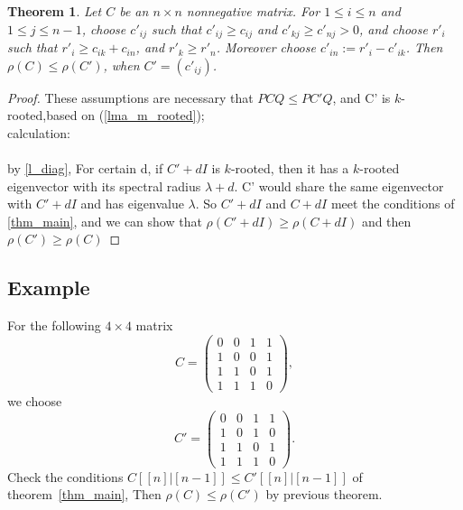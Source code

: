\documentclass{article}
\theoremstyle{plain}
\newtheorem{thm}{Theorem}[section]
\theoremstyle{definition}
\begin{document}
\begin{thm}
    Let $C$ be an $n\times n$ nonnegative matrix. For $1\leq i \leq n$ and $1\leq j\leq n-1$, choose $c'_{ij}$
    such that $c'_{ij}\geq c_{ij}$ and $c'_{kj}\geq c'_{nj}>0$, and choose $r'_i$ such that $r'_i\geq c_{ik}+c_{in}$, and
    $r'_k \geq r'_n$. Moreover choose $c'_{in}:=r'_i-c'_{ik}$. Then $\rho(C)\leq \rho(C')$, when $C'=(c'_{ij})$.
\end{thm}

\begin{proof}
    These assumptions are necessary that $PCQ \leq PC'Q$, and C' is $k$-rooted,based on
    (\ref{lma_m_rooted});\\
    calculation:  \\
       \\
    by \ref{l_diag}, For certain d, if $C'+dI$ is $k$-rooted, then it has
     a $k$-rooted eigenvector with its spectral radius $\lambda + d$. C' would share the same
      eigenvector with $C'+dI$ and has eigenvalue $\lambda$. So $C'+dI$ and $C+dI$ meet the
       conditions of \ref{thm_main}, and we can show that $\rho(C' + dI) \geq \rho(C +dI)$ and
        then $\rho(C') \geq \rho(C)$  %
\end{proof}


\subsection{Example}
    For the following $4\times 4$ matrix
    $$C=\begin{pmatrix}
    0 & 0 & 1 & 1\\
    1 & 0 & 0 & 1\\
    1 & 1 & 0 & 1\\
    1 & 1 & 1 & 0
    \end{pmatrix},$$
    we choose
    $$C'=\begin{pmatrix}
    0 & 0 & 1 & 1\\
    1 & 0 & 1 &  0\\
    1 & 1 & 0 & 1\\
    1 & 1 & 1 & 0
    \end{pmatrix}.$$
    Check the conditions $C[[n]|[n-1]]  \leq C'[[n]|[n-1]] $ of theorem~\ref{thm_main},
    Then
    $\rho(C)\leq \rho(C')$ by previous theorem.
\end{document}
